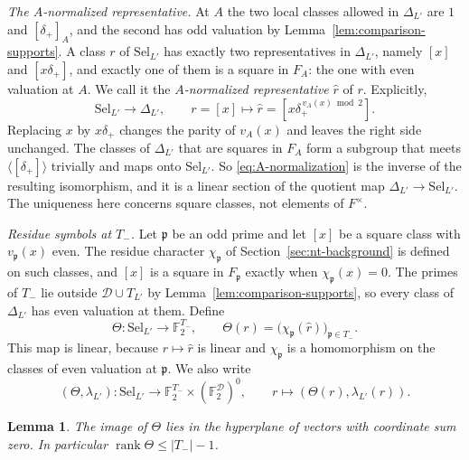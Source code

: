 \documentclass[11pt]{article}
\theoremstyle{plain}
\newtheorem{lemma}[theorem]{Lemma}
\theoremstyle{definition}
\theoremstyle{remark}
\newcommand{\F}{\mathbb F}
\begin{document}
\emph{The $A$-normalized representative.}  At $A$ the two local classes
allowed in $\Delta_{L'}$ are $1$ and $[\delta_+]_A$, and the second has odd
valuation by Lemma~\ref{lem:comparison-supports}.  A class $r$ of
$\mathrm{Sel}_{L'}$ has exactly two representatives in $\Delta_{L'}$,
namely $[x]$ and $[x\delta_+]$, and exactly one of them is a square in
$F_A$: the one with even valuation at $A$.  We call it the
\emph{$A$-normalized representative} $\hat r$ of $r$.  Explicitly,
\begin{equation}\label{eq:A-normalization}
 \mathrm{Sel}_{L'}\longrightarrow\Delta_{L'},
 \qquad r=[x]\longmapsto\hat r=[x\delta_+^{\,v_A(x)\bmod2}].
\end{equation}
Replacing $x$ by $x\delta_+$ changes the parity of $v_A(x)$ and leaves the
right side unchanged.  The classes of $\Delta_{L'}$ that are squares in
$F_A$ form a subgroup that meets $\langle[\delta_+]\rangle$ trivially and
maps onto $\mathrm{Sel}_{L'}$.  So \eqref{eq:A-normalization} is the
inverse of the resulting isomorphism, and it is a linear section of the
quotient map $\Delta_{L'}\to\mathrm{Sel}_{L'}$.  The
uniqueness here concerns square classes, not elements of $F^\times$.

\emph{Residue symbols at $T_-$.}  Let $\mathfrak p$ be an odd prime and
let $[x]$ be a square class with $v_{\mathfrak p}(x)$ even.  The residue
character $\chi_{\mathfrak p}$ of Section~\ref{sec:nt-background} is
defined on such classes, and $[x]$ is a square in $F_{\mathfrak p}$
exactly when $\chi_{\mathfrak p}(x)=0$.  The primes of
$T_-$ lie outside $\mathcal D\cup T_{L'}$ by
Lemma~\ref{lem:comparison-supports}, so every class of $\Delta_{L'}$ has
even valuation at them.  Define
\begin{equation}\label{eq:Theta}
 \Theta:\mathrm{Sel}_{L'}\longrightarrow\F_2^{T_-},
 \qquad \Theta(r)=\bigl(\chi_{\mathfrak p}(\hat r)\bigr)_{\mathfrak p\in T_-}.
\end{equation}
This map is linear, because $r\mapsto\hat r$ is linear and
$\chi_{\mathfrak p}$ is a homomorphism on the classes of even valuation at
$\mathfrak p$.  We also write
\[
 (\Theta,\lambda_{L'}):\mathrm{Sel}_{L'}\longrightarrow
 \F_2^{T_-}\times(\F_2^{\mathcal D})^0,\qquad
 r\longmapsto(\Theta(r),\lambda_{L'}(r)).
\]

\begin{lemma}\label{lem:comparison-reciprocity}
The image of $\Theta$ lies in the hyperplane of vectors with coordinate sum
zero.  In particular $\operatorname{rank}\Theta\le|T_-|-1$.
\end{lemma}
\end{document}
